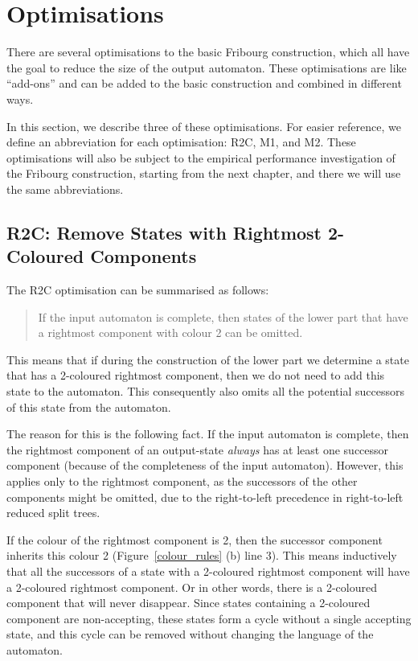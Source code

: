 \section{Optimisations}
\label{3_optimisations}
There are several optimisations to the basic Fribourg construction, which all have the goal to reduce the size of the output automaton. These optimisations are like ``add-ons'' and can  be added to the basic construction and combined in different ways.

In this section, we describe three of these optimisations. For easier reference, we define an abbreviation for each optimisation: R2C, M1, and M2. These optimisations will also be subject to the empirical performance investigation of the Fribourg construction, starting from the next chapter, and there we will use the same abbreviations.

\subsection{R2C: Remove States with Rightmost 2-Coloured Components}
The R2C optimisation can be summarised as follows:

\begin{quote}
\centering
If the input automaton is complete, then states of the lower part that have a rightmost component with colour 2 can be omitted.
\end{quote}

This means that if during the construction of the lower part we determine a state that has a 2-coloured rightmost component, then we do not need to add this state to the automaton. This consequently also omits all the potential successors of this state from the automaton.

The reason for this is the following fact. If the input automaton is complete, then the rightmost component of an output-state \textit{always} has at least one successor component (because of the completeness of the input automaton). However, this applies only to the rightmost component, as the successors of the other components might be omitted, due to the right-to-left precedence in right-to-left reduced split trees.

If the colour of the rightmost component is 2, then the successor component inherits this colour 2 (Figure~\ref{colour_rules} (b) line 3). This means inductively that all the successors of a state with a 2-coloured rightmost component will have a 2-coloured rightmost component. Or in other words, there is a 2-coloured component that will never disappear. Since states containing a 2-coloured component are non-accepting, these states form a cycle without a single accepting state, and this cycle can be removed without changing the language of the automaton.

